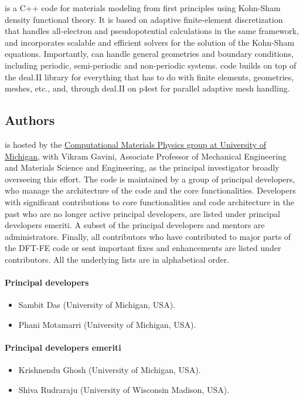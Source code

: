 \dftfe{} is a C++ code for materials modeling from first principles using Kohn-Sham density functional theory.
It is based on adaptive finite-element discretization that handles all-electron and pseudopotential calculations in the 
same framework, and incorporates scalable and efficient solvers for the solution of the Kohn-Sham equations. Importantly, \dftfe{} can handle general geometries and boundary conditions, including periodic, semi-periodic and non-periodic systems. \dftfe{} code builds on top of the deal.II library for everything 
that has to do with finite elements, geometries, meshes, etc., and, through deal.II on p4est for parallel adaptive mesh handling.

\subsection{Authors}
\label{sec:authors}
\dftfe{} is hosted by the \href{http://www-personal.umich.edu/~vikramg/}{Computational Materials Physics
group at University of Michigan}, with Vikram Gavini, Associate Professor of Mechanical Engineering and Materials Science and Engineering, as
the principal investigator broadly overseeing this effort. The code is maintained by a group of principal developers, 
who manage the architecture of the code and the core functionalities. Developers with
significant contributions to core functionalities and code architecture in the past who are 
no longer active principal developers, are listed under principal developers emeriti. 
A subset of the principal developers and mentors are administrators. Finally, all contributors who have
contributed to major parts of the DFT-FE code or sent important fixes and enhancements are listed
under contributors. All the underlying lists are in alphabetical order. 

\paragraph{Principal developers}
\begin{itemize}
	\item Sambit Das (University of Michigan, USA).
	\item Phani Motamarri (University of Michigan, USA).
\end{itemize}

\paragraph{Principal developers emeriti}
\begin{itemize}
	\item Krishnendu Ghosh (University of Michigan, USA).
	\item Shiva Rudraraju (University of Wisconsin Madison, USA).	
\end{itemize}

